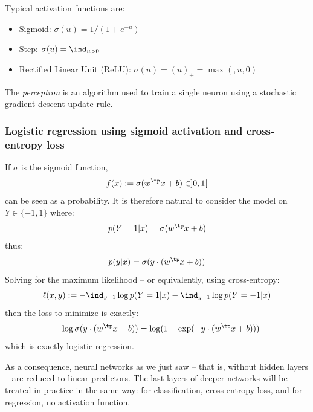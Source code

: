 \documentclass[toc, titlepaged]{../cs-classes/cs-classes}
\begin{document}
Typical activation functions are:
\begin{itemize}
    \item Sigmoid: $\sigma(u)=1/(1+e^{-u})$
    \item Step: $\sigma(u)=\ind_{u>0}$
    \item Rectified Linear Unit (ReLU): $\sigma(u)=(u)_+=\max(,u, 0)$
\end{itemize}

\begin{definition}[Perceptron]
    The \emph{perceptron} is an algorithm used to train a single neuron using a stochastic gradient descent update rule.
\end{definition}

\subsubsection{Logistic regression using sigmoid activation and cross-entropy loss}
If $\sigma$ is the sigmoid function, 
\begin{equation*}
    f(x):=\sigma(w^\tp x+b)\in]0, 1[
\end{equation*}
can be seen as a probability. It is therefore natural to consider the model on $Y\in\{-1, 1\}$ where:
\begin{equation*}
    p(Y=1|x)=\sigma(w^\tp x+b)
\end{equation*}
thus:
\begin{equation*}
    p(y|x)=\sigma(y\cdot(w^\tp x+b))
\end{equation*}
Solving for the maximum likelihood -- or equivalently, using cross-entropy:
\begin{equation*}
    \ell(x, y) := -\ind_{y=1}\log p(Y=1|x) - \ind_{y=1}\log p(Y=-1|x)
\end{equation*}
then the loss to minimize is exactly:
\begin{equation*}
    -\log\sigma(y\cdot(w^\tp x+b)) = \log(1+\exp(-y\cdot(w^\tp x+b)))
\end{equation*}
which is exactly logistic regression.

As a consequence, neural networks as we just saw -- that is, without hidden layers -- are reduced to linear predictors. The last layers of deeper networks will be treated in practice in the same way: for classification, cross-entropy loss, and for regression, no activation function.
\end{document}

